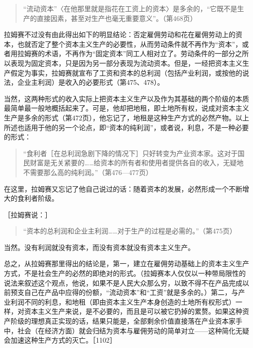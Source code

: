 \begin{quote}{“流动资本”〈在他那里就是指花在工资上的资本〉是多余的，“它既不是生产的直接因素，甚至对生产也毫无重要意义”。（第468页）}\end{quote}

拉姆赛不过没有由此得出如下的明显结论：否定雇佣劳动和花在雇佣劳动上的资本，也就否定了整个资本主义生产的必要性，从而劳动条件就不再作为“资本”，或者用拉姆赛的术语，不再作为“固定资本”同工人相对立了。劳动条件的一部分之所以表现为固定资本，只是因为另一部分表现为流动资本。但是，一经把资本主义生产假定为事实，拉姆赛就宣布了工资和资本的总利润（包括产业利润，或按他的说法，企业主利润）是收入的必要形式（第475、478）。

当然，这两种形式的收入实际上把资本主义生产以及作为其基础的两个阶级的本质最简单最一般地概括起来了。可是，他却把地租，即土地所有权，说成对资本主义生产是多余的形式（第472页），他忘记了，地租是这种生产方式的必然产物。以上所述也适用于他的另一个论点，即“资本的纯利润”，或者说，利息，不是一种必要的形式：

\begin{quote}{“食利者［在总利润急剧下降的情况下］只好转变为产业资本家。这对于国民财富是无关紧要的……给资本的所有者和使用者提供各自的收入，无疑地不需要那么高的纯利润。”（第476—477页）}\end{quote}

在这里，拉姆赛又忘记了他自己说过的话：随着资本的发展，必然形成一个不断增大的食利者阶级。

［拉姆赛说：］

\begin{quote}{“资本的总利润和企业主利润……对于生产的过程是必需的。”（第475页）}\end{quote}

当然。没有利润就没有资本，而没有资本就没有资本主义生产。


总之，从拉姆赛那里得出的结论是，第一，建立在雇佣劳动基础上的资本主义生产方式，不是社会生产的必然的即绝对的形式。（拉姆赛本人仅仅以一种带局限性的说法来叙述这个观点，他说，如果不是人民大众那么穷，以致不得不在产品完成以前预支自己在产品中应得的份额，“流动资本”和“工资”就是多余的。）第二，与产业利润不同的利息，和地租（即由资本主义生产本身创造的土地所有权形式）一样，对资本主义生产来说，是不必要的，而且是可以被它扔掉的累赘。如果这种资产阶级的理想真正实现的话，结果只能是，全部剩余价值直接落在产业资本家手中，社会（在经济方面）就会归结为资本与雇佣劳动的简单对立——这种简化无疑会加速这种生产方式的灭亡。［1102］

